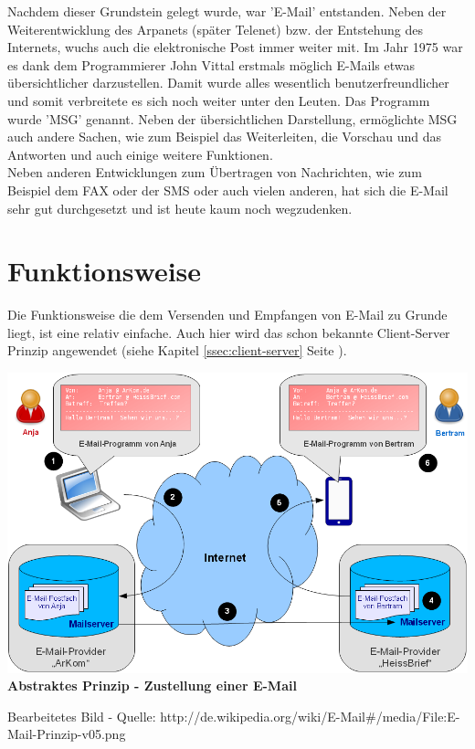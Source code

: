 \documentclass[12pt,a4paper]{report}
\begin{document}
\begin{onehalfspace}
Nachdem dieser Grundstein gelegt wurde, war 'E-Mail' entstanden. Neben der Weiterentwicklung des Arpanets (später Telenet) bzw. der Entstehung des Internets, wuchs auch die elektronische Post immer weiter mit. Im Jahr 1975 war es dank dem Programmierer John Vittal erstmals möglich E-Mails etwas übersichtlicher darzustellen. Damit wurde alles wesentlich benutzerfreundlicher und somit verbreitete es sich noch weiter unter den Leuten. Das Programm wurde 'MSG' genannt. Neben der übersichtlichen Darstellung, ermöglichte MSG auch andere Sachen, wie zum Beispiel das Weiterleiten, die Vorschau und das Antworten und auch einige weitere Funktionen.\\

Neben anderen Entwicklungen zum Übertragen von Nachrichten, wie zum Beispiel dem FAX oder der SMS oder auch vielen anderen, hat sich die E-Mail sehr gut durchgesetzt und ist heute kaum noch wegzudenken.
\section{Funktionsweise}
Die Funktionsweise die dem Versenden und Empfangen von E-Mail zu Grunde liegt, ist eine relativ einfache. Auch hier wird das schon bekannte Client-Server Prinzip angewendet (siehe Kapitel \ref{ssec:client-server} Seite \pageref{ssec:client-server}).\\

\begin{center}
\includegraphics[scale=0.6]{../docs/lyaton/graphics/E-Mail-Prinzip.png}\\
\textbf{Abstraktes Prinzip - Zustellung einer E-Mail}\\
\begin{scriptsize}
Bearbeitetes Bild - Quelle: http://de.wikipedia.org/wiki/E-Mail\#/media/File:E-Mail-Prinzip-v05.png
\end{scriptsize}
\end{center}
\vspace{0.5cm}


\end{onehalfspace}
\end{document}
